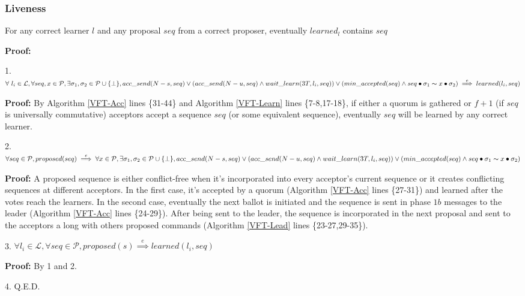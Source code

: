\subsubsection{Liveness}
\begin{theorem}
For any correct learner $l$ and any proposal $seq$ from a correct proposer, eventually $learned_l$ contains $seq$ \label{L-T1} \par
\end{theorem} 
\parbox{\linewidth}{\textbf{Proof:}} \par
\parbox{\linewidth}{\strut1. $\forall\ l_i \in \mathcal{L},\forall seq,x \in \mathcal{P}, \exists \sigma_1,\sigma_2 \in \mathcal{P} \cup \{\bot\}, acc\_send(N-s, seq) \lor (acc\_send(N-u, seq) \land wait\_learn(3T,l_i,seq)) \lor (min\_accepted(seq) \land seq \bullet \sigma_1 \thicksim x \bullet \sigma_2) \overset{e}{\implies} learned(l_i,seq)$}\par
\indent\indent\parbox{\linewidth}{\strut\textbf{Proof:} By Algorithm \ref{VFT-Acc} lines \{31-44\} and Algorithm \ref{VFT-Learn} lines \{7-8,17-18\}, if either a quorum is gathered or $f+1$ (if $seq$ is universally commutative) acceptors accept a sequence $seq$ (or some equivalent sequence), eventually $seq$ will be learned by any correct learner.}\par
\parbox{\linewidth}{\strut2. $\forall seq \in \mathcal{P}, proposed(seq) \overset{e}{\implies} \forall x \in \mathcal{P}, \exists \sigma_1,\sigma_2 \in \mathcal{P} \cup \{\bot\}, acc\_send(N-s, seq) \lor (acc\_send(N-u, seq) \land wait\_learn(3T,l_i,seq)) \lor (min\_accepted(seq) \land seq \bullet \sigma_1 \thicksim x \bullet \sigma_2)$} \par
\indent\indent\parbox{\linewidth}{\strut\textbf{Proof:} A proposed sequence is either conflict-free when it's incorporated into every acceptor's current sequence or it creates conflicting sequences at different acceptors. In the first case, it's accepted by a quorum (Algorithm \ref{VFT-Acc} lines \{27-31\}) and learned after the votes reach the learners. In the second case, eventually the next ballot is initiated and the sequence is sent in phase $1b$ messages to the leader (Algorithm \ref{VFT-Acc} lines \{24-29\}). After being sent to the leader, the sequence is incorporated in the next proposal and sent to the acceptors a long with others proposed commands (Algorithm \ref{VFT-Lead} lines \{23-27,29-35\}).} \par
\parbox{\linewidth}{\strut3. $\forall l_i \in \mathcal{L}, \forall seq \in \mathcal{P}, proposed(s) \overset{e}{\implies} learned(l_i,seq)$} \par
\indent\indent\parbox{\linewidth}{\strut\textbf{Proof:} By 1 and 2.} \par
\parbox{\linewidth}{\strut4. Q.E.D.}